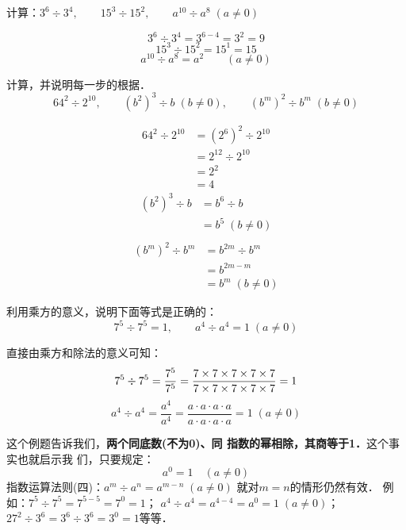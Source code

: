 \begin{example}
    计算：$3^6\div 3^4,\qquad 15^3\div 15^2,\qquad a^{10}\div a^8 \; (a\ne 0)$
\end{example}

\begin{solution}
    \[3^6\div 3^4=3^{6-4}=3^2=9 \]
    \[15^3\div 15^2=15^1=15\]
    \[a^{10}\div a^8=a^2\qquad (a\ne 0)\]
\end{solution}

\begin{example}
    计算，并说明每一步的根据．
\[64^2\div 2^{10},\qquad (b^2)^3\div b\; (b\ne 0),\qquad (b^m)^2\div b^m\; (b\ne 0) \]
\end{example}

\begin{solution}
\begin{align*}
    64^2\div 2^{10}&=(2^6)^2\div 2^{10} \tag{乘方的意义}\\
    &=2^{12}\div 2^{10} \tag{指数运算律（三）}\\
    &=2^2 \tag{指数运算律（四）}\\
    &=4\tag{乘方的意义}
\end{align*}    
\begin{align*}
    (b^2)^3\div b &=b^6\div b \tag{指数运算律（三）}\\
    &=b^5 \; (b\ne 0)\tag{指数运算律（四）}\\
\end{align*} 
\begin{align*}
    (b^m)^2\div b^m  &=b^{2m}\div b^m \tag{指数运算律（三）}\\
    &=b^{2m-m}\tag{指数运算律（四）}\\
    &=b^m \; (b\ne 0)
\end{align*} 
\end{solution}

\begin{example}
    利用乘方的意义，说明下面等式是正确的：
\[7^5\div 7^5=1,\qquad a^4\div a^4=1\; (a\ne 0) \]
\end{example}

\begin{solution}
    直接由乘方和除法的意义可知：
\[ 7^5\div 7^5=\dfrac{7^5}{7^5}=\dfrac{7\times7\times7\times7\times7}{7\times7\times7\times7\times7}=1 \]
\[a^4\div a^4=\frac{a^4}{a^4}=\frac{a\cdot a\cdot a\cdot a}{a\cdot a\cdot a\cdot a}=1\; (a\ne 0)\]
\end{solution}

这个例题告诉我们，\textbf{两个同底数(不为0)、同
指数的幂相除，其商等于1．}这个事实也就启示我
们，只要规定：
\[a^0=1\quad (a\ne 0) \]
指数运算法则(四)：$a^m\div a^n=a^{m-n}\; (a\ne 0)$
就对$m=n$的情形仍然有效．
例如：$7^5\div 7^5=7^{5-5}=7^0=1$；
$a^4\div a^4=a^{4-4}=a^0=1\; (a\ne 0)$；$27^2\div 3^6=3^6\div 3^6=3^0=1$等等．

